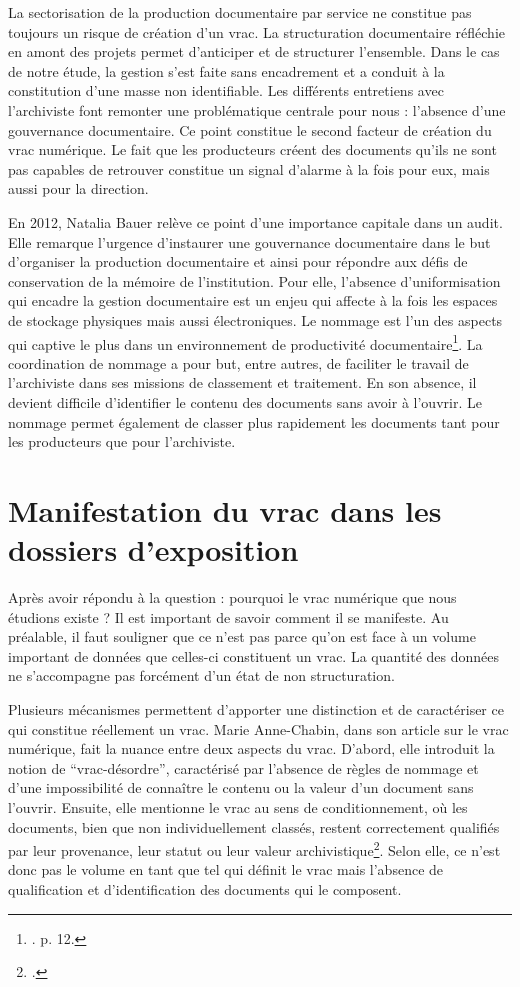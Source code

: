 La sectorisation de la production documentaire par service ne constitue pas toujours un risque de création d’un vrac. La structuration documentaire réfléchie en amont des projets permet d’anticiper et de structurer l’ensemble. Dans le cas de notre étude, la gestion s’est faite sans encadrement et a conduit à la constitution d’une masse non identifiable. Les différents entretiens avec l’archiviste font remonter une problématique centrale pour nous : l’absence d’une gouvernance documentaire. Ce point constitue le second facteur de création du vrac numérique. Le fait que les  producteurs créent des documents qu’ils ne sont pas capables de retrouver constitue un signal d’alarme à la fois pour eux, mais aussi pour la direction.

En 2012, Natalia Bauer relève ce point d’une importance capitale dans un audit. Elle remarque l’urgence d’instaurer une gouvernance documentaire dans le but d’organiser la production documentaire et ainsi pour répondre aux défis de conservation de la mémoire de l’institution. Pour elle, l’absence d’uniformisation qui encadre la gestion documentaire est un enjeu qui affecte à la fois les espaces de stockage physiques mais aussi électroniques. 
Le nommage est l’un des aspects qui captive le plus dans un environnement de productivité documentaire\footnote{\cite{bauer-archives-publiques-2012}. p. 12.}. La coordination de nommage a pour but, entre autres, de faciliter le travail de l’archiviste dans ses missions de classement et traitement. En son absence, il devient difficile d’identifier le contenu des documents sans avoir à l'ouvrir. Le nommage permet également de classer plus rapidement les documents tant pour les producteurs que pour l’archiviste.


\section{Manifestation du vrac dans les dossiers d’exposition}

Après avoir répondu à la question : pourquoi le vrac numérique que nous étudions existe ? Il est important de savoir comment il se manifeste. Au préalable, il faut souligner que ce n'est pas parce qu’on est face à un volume important de données que celles-ci constituent un vrac. La quantité des données ne s’accompagne pas forcément d’un état de non structuration.

Plusieurs mécanismes permettent d’apporter une distinction et de caractériser ce qui constitue réellement un vrac. Marie Anne-Chabin, dans son article sur le vrac numérique, fait la nuance entre deux aspects du vrac. D’abord, elle introduit la notion de \enquote{vrac-désordre}, caractérisé par l'absence de règles de nommage et d’une impossibilité de connaître le contenu ou la valeur d'un document sans l'ouvrir. Ensuite, elle mentionne le vrac au sens de conditionnement, où les documents, bien que non individuellement classés, restent correctement qualifiés par leur provenance, leur statut ou leur valeur archivistique\footnote{\cite{chabin-vrac-2016}.}. Selon elle, ce n'est donc pas le volume en tant que tel qui définit le vrac mais l'absence de qualification et d'identification des documents qui le composent.


